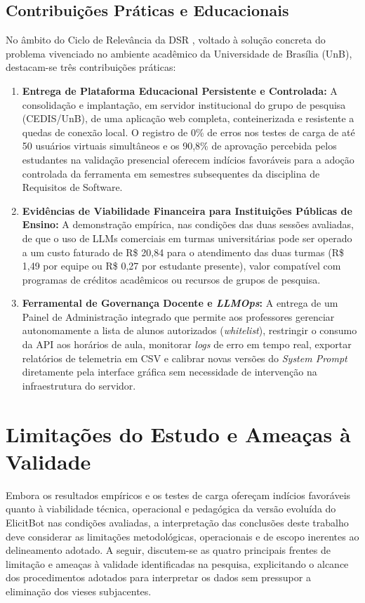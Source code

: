 \subsection{Contribuições Práticas e Educacionais}

No âmbito do Ciclo de Relevância da DSR \cite{hevner2007}, voltado à solução concreta do problema vivenciado no ambiente acadêmico da Universidade de Brasília (UnB), destacam-se três contribuições práticas:

\begin{enumerate}
    \item \textbf{Entrega de Plataforma Educacional Persistente e Controlada:} A consolidação e implantação, em servidor institucional do grupo de pesquisa (CEDIS/UnB), de uma aplicação web completa, conteinerizada e resistente a quedas de conexão local. O registro de 0\% de erros nos testes de carga de até 50 usuários virtuais simultâneos e os 90,8\% de aprovação percebida pelos estudantes na validação presencial oferecem indícios favoráveis para a adoção controlada da ferramenta em semestres subsequentes da disciplina de Requisitos de Software.
    \item \textbf{Evidências de Viabilidade Financeira para Instituições Públicas de Ensino:} A demonstração empírica, nas condições das duas sessões avaliadas, de que o uso de LLMs comerciais em turmas universitárias pode ser operado a um custo faturado de R\$ 20,84 para o atendimento das duas turmas (R\$ 1,49 por equipe ou R\$ 0,27 por estudante presente), valor compatível com programas de créditos acadêmicos ou recursos de grupos de pesquisa.
    \item \textbf{Ferramental de Governança Docente e \textit{LLMOps}:} A entrega de um Painel de Administração integrado que permite aos professores gerenciar autonomamente a lista de alunos autorizados (\textit{whitelist}), restringir o consumo da API aos horários de aula, monitorar \textit{logs} de erro em tempo real, exportar relatórios de telemetria em CSV e calibrar novas versões do \textit{System Prompt} diretamente pela interface gráfica sem necessidade de intervenção na infraestrutura do servidor.
\end{enumerate}

\section{Limitações do Estudo e Ameaças à Validade}
\label{sec:limitacoes_estudo}

Embora os resultados empíricos e os testes de carga ofereçam indícios favoráveis quanto à viabilidade técnica, operacional e pedagógica da versão evoluída do ElicitBot nas condições avaliadas, a interpretação das conclusões deste trabalho deve considerar as limitações metodológicas, operacionais e de escopo inerentes ao delineamento adotado. A seguir, discutem-se as quatro principais frentes de limitação e ameaças à validade identificadas na pesquisa, explicitando o alcance dos procedimentos adotados para interpretar os dados sem pressupor a eliminação dos vieses subjacentes.

